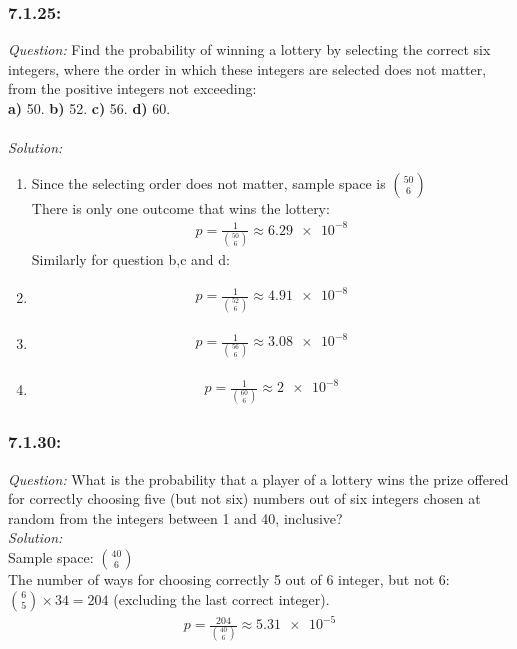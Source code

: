 \documentclass[a4paper]{article}
\begin{document}
\subsubsection*{7.1.25:}
\textit{Question:} Find the probability of winning a lottery by selecting the correct six integers, where the order in which these integers are selected does not matter, from the positive integers not exceeding: \\
\textbf{a)} 50. \textbf{b)} 52. \textbf{c)} 56. \textbf{d)} 60. \\ \\
\textit{Solution:}
\begin{enumerate}[label = (\alph*)]
	\item Since the selecting order does not matter, sample space is ${50 \choose 6}$\\
	      There is only one outcome that wins the lottery:
	      \begin{align*}
		      p  = \frac{1}{{50 \choose 6}} \approx \num{6.29e-8}
	      \end{align*}
	      Similarly for question b,c and d:\\
	\item 
	      \begin{align*}
		      p  = \frac{1}{{52 \choose 6}} \approx \num{4.91e-8}
	      \end{align*}
	\item 
	      \begin{align*}
		      p  = \frac{1}{{56 \choose 6}} \approx \num{3.08e-8}
	      \end{align*}
	\item 
	      \begin{align*}
		      p  = \frac{1}{{60 \choose 6}} \approx \num{2e-8}
	      \end{align*}
\end{enumerate}

\subsubsection*{7.1.30:}
\textit{Question:} What is the probability that a player of a lottery wins the prize offered for correctly choosing five (but not six) numbers out of six integers chosen at random from the integers between 1 and 40, inclusive? \\
\textit{Solution:} \\
Sample space: ${40 \choose 6}$ \\
The number of ways for choosing correctly 5 out of 6 integer, but not 6: ${6 \choose 5} \times 34 = 204$ (excluding the last correct integer).
\begin{align*}
	p = \frac{204}{{40 \choose 6}} \approx \num{5.31e-5}
\end{align*}
\end{document}
